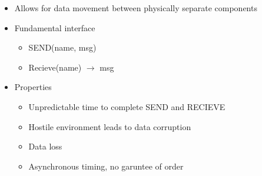\documentclass{report}
\begin{document}
\begin{description}
\begin{enumerate}
                \begin{itemize}
                    \item Allows for data movement between physically separate components
                    \item Fundamental interface
                        \begin{itemize}
                            \item SEND(name, msg)
                            \item Recieve(name) $\to$ msg
                        \end{itemize}
                    \item Properties
                        \begin{itemize}
                            \item Unpredictable time to complete SEND and RECIEVE
                            \item Hostile environment leads to data corruption
                            \item Data loss
                            \item Asynchronous timing, no garuntee of order
                        \end{itemize}
                \end{itemize}
        \end{enumerate}
\end{description}
\end{document}
